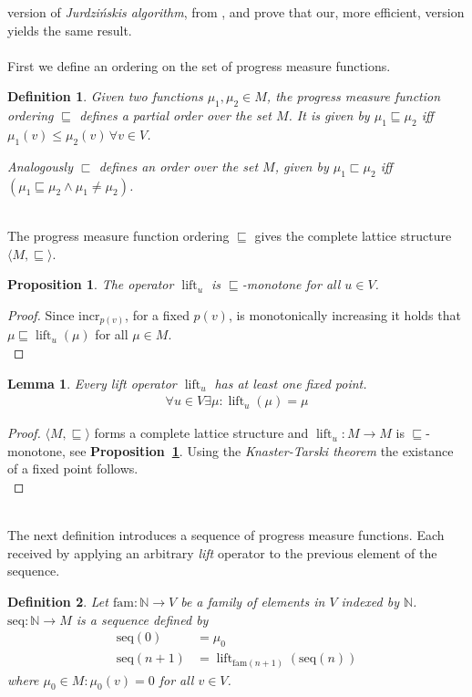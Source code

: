 \documentclass[12pt,oneside,bibliography=totoc,abstracton]{scrartcl}
\DeclareMathOperator{\lift}{lift}
\newcommand{\propositionref}[1]{\textbf{Proposition~\ref{#1}}}
\newcommand{\libref}[1]{\textbf{\cite{#1}}}
\newtheorem{mydef}{Definition}
\newtheorem{mylemma}{Lemma}
\newtheorem{myproposition}{Proposition}
\begin{document}
version of \textit{Jurdzi\'nskis algorithm}, from \libref{jurdz_original}, and prove that our,
more efficient, version yields the same result.\\\\
First we define an ordering on the set of progress measure functions.
\begin{mydef}
	Given two functions $\mu_1, \mu_2 \in M$, the \textnormal{progress measure function ordering} $\sqsubseteq$
	defines a partial order over the set $M$. It is given by $\mu_1 \sqsubseteq \mu_2$ iff
	$\mu_1(v) \le \mu_2(v)\,\forall v \in V$.
	
	Analogously $\sqsubset$ defines an order over the set $M$, given by $\mu_1 \sqsubset \mu_2$ iff
	$(\mu_1 \sqsubseteq \mu_2 \land \mu_1 \ne \mu_2)$.
\end{mydef}\quad\\
The progress measure function ordering $\sqsubseteq$ gives the complete lattice structure $\langle M, \sqsubseteq \rangle$.
\begin{myproposition}\label{proposition_liftmonotone}
	The operator $\lift_u$ is $\sqsubseteq$-monotone for all $u \in V$.
\end{myproposition}
\begin{proof}
	Since $\text{incr}_{p(v)}$, for a fixed $p(v)$, is monotonically increasing it holds that
	$\mu \sqsubseteq \lift_u(\mu)$ for all $\mu \in M$.\\
\end{proof}
\begin{mylemma}\label{lemma_liftfixedpoint}
	Every lift operator $\lift_u$ has at least one fixed point.
	\begin{align*}
		\forall u \in V \exists \mu : \lift_u(\mu) = \mu
	\end{align*}
\end{mylemma}
\begin{proof}
	$\langle M, \sqsubseteq \rangle$ forms a complete lattice structure and $\lift_u: M \to M$
	is $\sqsubseteq$-monotone, see \propositionref{proposition_liftmonotone}.
	Using the \textit{Knaster-Tarski theorem} \libref{knaster_tarski} the existance of a
	fixed point follows.\\
\end{proof}\quad\\
The next definition introduces a sequence of progress measure functions. Each received by
applying an arbitrary \textit{lift} operator to the previous element of the sequence.
\begin{mydef}\label{def_sequence}
	Let $\text{fam}: \mathbb{N} \to V$ be a family of elements in $V$ indexed by $\mathbb{N}$.
	$\text{seq}: \mathbb{N} \to M$ is a sequence defined by
	\begin{align*}
		\text{seq}(0)	&= \mu_0\\
		\text{seq}(n + 1)	&= \lift_{\text{fam}(n + 1)}(\text{seq}(n))
	\end{align*}
	where $\mu_0 \in M : \mu_0(v) = 0$ for all $v \in V$.
\end{mydef}\quad\\
\end{document}
